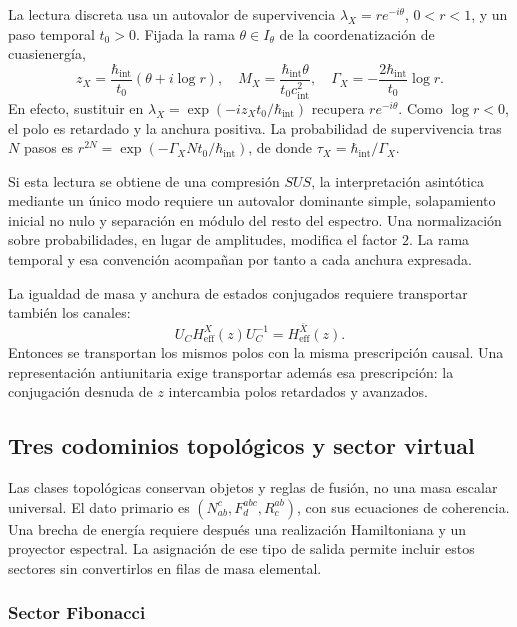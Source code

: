 La lectura discreta usa un autovalor de supervivencia
\(\lambda_X=re^{-i\theta}\), \(0<r<1\), y un paso temporal
\(t_0>0\). Fijada la rama \(\theta\in I_\theta\) de la coordenatización de
cuasienergía,
\begin{equation}
 z_X=\frac{\hbar_{\mathrm{int}}}{t_0}
 (\theta+i\log r),\quad
 M_X=\frac{\hbar_{\mathrm{int}}\theta}{t_0c_{\mathrm{int}}^2},\quad
 \Gamma_X=-\frac{2\hbar_{\mathrm{int}}}{t_0}\log r.
 \label{vi:eq:anchura-discreta-familias}
\end{equation}
En efecto, sustituir en
\(\lambda_X=\exp(-iz_Xt_0/\hbar_{\mathrm{int}})\) recupera
\(re^{-i\theta}\). Como \(\log r<0\), el polo es retardado y la
anchura positiva. La probabilidad de supervivencia tras \(N\) pasos es
\(r^{2N}=\exp(-\Gamma_XNt_0/\hbar_{\mathrm{int}})\), de donde
\(\tau_X=\hbar_{\mathrm{int}}/\Gamma_X\).

Si esta lectura se obtiene de una compresión \(SUS\), la interpretación
asintótica mediante un único modo requiere un autovalor dominante
simple, solapamiento inicial no nulo y separación en módulo del resto
del espectro. Una normalización sobre probabilidades, en lugar de
amplitudes, modifica el factor \(2\). La rama temporal y esa convención
acompañan por tanto a cada anchura expresada.

La igualdad de masa y anchura de estados conjugados requiere transportar
también los canales:
\[
 U_C H_{\mathrm{eff}}^X(z)U_C^{-1}=H_{\mathrm{eff}}^{\bar X}(z).
\]
Entonces se transportan los mismos polos con la misma prescripción
causal. Una representación antiunitaria exige transportar además esa
prescripción: la conjugación desnuda de \(z\) intercambia polos
retardados y avanzados.

\subsection{Tres codominios topológicos y sector virtual}
\label{vi:subsec:topologicos-familias}

Las clases topológicas conservan objetos y reglas de fusión, no una
masa escalar universal. El dato primario es
\((N_{ab}^{c},F^{abc}_d,R^{ab}_c)\), con sus ecuaciones de coherencia.
Una brecha de energía requiere después una realización Hamiltoniana y
un proyector espectral. La asignación de ese tipo de salida permite
incluir estos sectores sin convertirlos en filas de masa elemental.

\subsubsection{Sector Fibonacci}

